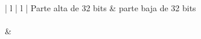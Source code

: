 \begin{center}
\begin{tabular}{ | l | l | }
\hline
	Parte alta de 32 bits & parte baja de 32 bits \\
\hline
{} \\
\hline
{} &  \\
\hline
\end{tabular}
\end{center}
